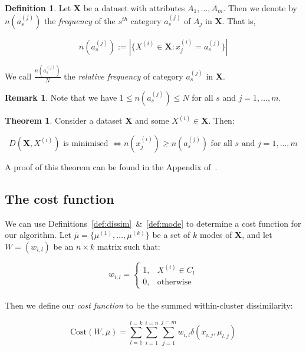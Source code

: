 \documentclass{article}
\theoremstyle{definition}
\newtheorem{definition}{Definition}[section]
\newtheorem{theorem}{Theorem}
\newtheorem*{remark}{Remark}
\begin{document}
\begin{definition}\label{def:rel-freq}
    Let \textbf{X} be a dataset with attributes \(A_1, \ldots, A_m\). Then we
    denote by \(n(a_s^{(j)})\) the \emph{frequency} of the \(s^{th}\) category 
    \(a_s^{(j)}\) of \(A_j\) in \textbf{X}. That is, 
	
    \[
	    n(a_s^{(j)}) := |{\{X^{(i)} \in \textbf{X}: x_j^{(i)} = a_s^{(j)}\}}|
	\]
	
    We call \(\frac{n(a_s^{(j)})}{N}\) the \emph{relative frequency} of category 
    \(a_s^{(j)}\) in \textbf{X}.
\end{definition}

\begin{remark}
    Note that we have \(1 \le n(a_s^{(j)}) \le N\) for all \(s\) and \(j = 1, 
    \ldots, m\).\\
\end{remark}

\begin{theorem}\label{theorem:1}
    Consider a dataset \textbf{X} and some \(X^{(i)} \in \textbf{X}\). Then:
	
    \[
	    D(\textbf{X}, X^{(i)}) \text{ is minimised } \iff n(x_j^{(i)}) \geq 
	    n(a_s^{(j)}) \text{ for all } s \text{ and } j = 1, \ldots, m 
	\]
\end{theorem}
A proof of this theorem can be found in the Appendix of~\cite{Huang98}.\\


\subsection{The cost function}\label{subsection:cost}

We can use Definitions~\ref{def:dissim}~\&~\ref{def:mode} to determine a cost 
function for our algorithm. Let \(\bar{\mu} = \{\mu^{(1)}, \ldots, \mu^{(k)}\}\) 
be a set of \(k\) modes of \textbf{X}, and let \(W = (w_{i,l})\) be an \(n 
\times k\) matrix such that:

\[ 
    w_{i,l} = \begin{cases}
                1, & X^{(i)} \in C_l \\
                0, & \text{otherwise}
              \end{cases}
\]\\

Then we define our \emph{cost function} to be the summed within-cluster 
dissimilarity:

\begin{equation}
    \text{Cost}(W, \bar{\mu}) = \sum_{l=1}^{l=k} \sum_{i=1}^{i=n} 
                                \sum_{j=1}^{j=m} w_{i,l} 
                                \delta(x_{i,j}, \mu_{l,j})
\end{equation}
\end{document}
